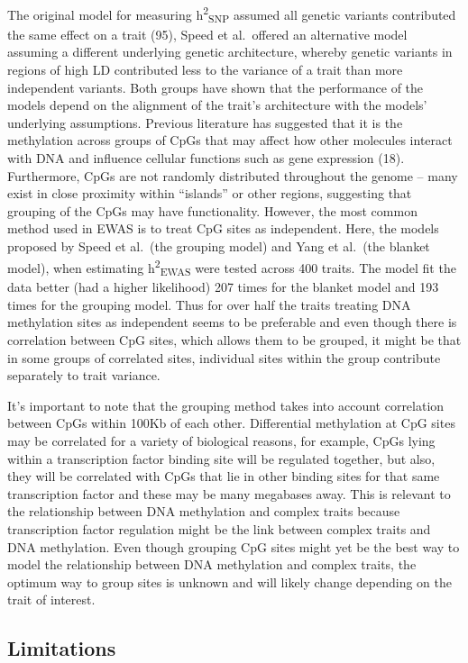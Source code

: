 \documentclass[11pt,oneside]{bristolthesis}
\begin{document}
The original model for measuring h\textsuperscript{2}\textsubscript{SNP} assumed all genetic variants contributed the same effect on a trait (95), Speed et al.~offered an alternative model assuming a different underlying genetic architecture, whereby genetic variants in regions of high LD contributed less to the variance of a trait than more independent variants. Both groups have shown that the performance of the models depend on the alignment of the trait's architecture with the models' underlying assumptions. Previous literature has suggested that it is the methylation across groups of CpGs that may affect how other molecules interact with DNA and influence cellular functions such as gene expression (18). Furthermore, CpGs are not randomly distributed throughout the genome -- many exist in close proximity within ``islands'' or other regions, suggesting that grouping of the CpGs may have functionality. However, the most common method used in EWAS is to treat CpG sites as independent. Here, the models proposed by Speed et al.~(the grouping model) and Yang et al.~(the blanket model), when estimating h\textsuperscript{2}\textsubscript{EWAS} were tested across 400 traits. The model fit the data better (had a higher likelihood) 207 times for the blanket model and 193 times for the grouping model. Thus for over half the traits treating DNA methylation sites as independent seems to be preferable and even though there is correlation between CpG sites, which allows them to be grouped, it might be that in some groups of correlated sites, individual sites within the group contribute separately to trait variance.

It's important to note that the grouping method takes into account correlation between CpGs within 100Kb of each other. Differential methylation at CpG sites may be correlated for a variety of biological reasons, for example, CpGs lying within a transcription factor binding site will be regulated together, but also, they will be correlated with CpGs that lie in other binding sites for that same transcription factor and these may be many megabases away. This is relevant to the relationship between DNA methylation and complex traits because transcription factor regulation might be the link between complex traits and DNA methylation. Even though grouping CpG sites might yet be the best way to model the relationship between DNA methylation and complex traits, the optimum way to group sites is unknown and will likely change depending on the trait of interest.

\hypertarget{limitations-05}{%
\subsection{Limitations}\label{limitations-05}}
\end{document}
